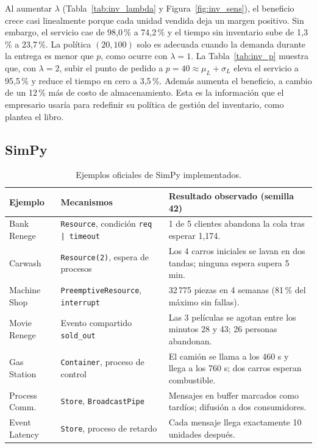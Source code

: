 \documentclass[11pt,a4paper]{article}
\begin{document}
Al aumentar $\lambda$ (Tabla~\ref{tab:inv_lambda} y Figura~\ref{fig:inv_sens}), el beneficio
crece casi linealmente porque cada unidad vendida deja un margen positivo. Sin embargo, el
servicio cae de 98,0\,\% a 74,2\,\% y el tiempo sin inventario sube de 1,3\,\% a 23,7\,\%.
La política $(20,100)$ solo es adecuada cuando la demanda durante la entrega es menor que
$p$, como ocurre con $\lambda=1$. La Tabla~\ref{tab:inv_p} muestra que, con $\lambda=2$,
subir el punto de pedido a $p=40\approx\mu_L+\sigma_L$ eleva el servicio a 95,5\,\% y reduce
el tiempo en cero a 3,5\,\%. Además aumenta el beneficio, a cambio de un 12\,\% más de costo
de almacenamiento. Esta es la información que el empresario usaría para redefinir su
política de gestión del inventario, como plantea el libro.

\subsection{SimPy}
\begin{table}[H]\centering\small
\caption{Ejemplos oficiales de SimPy implementados.}\label{tab:simpy}
\begin{tabular}{p{}p{}p{}}\toprule
\textbf{Ejemplo}&\textbf{Mecanismos}&\textbf{Resultado observado (semilla 42)}\\\midrule
Bank Renege&\texttt{Resource}, condición \texttt{req | timeout}&1 de 5 clientes abandona
la cola tras esperar 1,174.\\
Carwash&\texttt{Resource(2)}, espera de procesos&Los 4 carros iniciales se lavan en dos
tandas; ninguna espera supera 5 min.\\
Machine Shop&\texttt{PreemptiveResource}, \texttt{interrupt}&32\,775 piezas en 4 semanas
(81\,\% del máximo sin fallas).\\
Movie Renege&Evento compartido \texttt{sold\_out}&Las 3 películas se agotan entre los
minutos 28 y 43; 26 personas abandonan.\\
Gas Station&\texttt{Container}, proceso de control&El camión se llama a los 460 s y llega a
los 760 s; dos carros esperan combustible.\\
Process Comm.&\texttt{Store}, \texttt{BroadcastPipe}&Mensajes en buffer marcados como
tardíos; difusión a dos consumidores.\\
Event Latency&\texttt{Store}, proceso de retardo&Cada mensaje llega exactamente 10 unidades
después.\\\bottomrule
\end{tabular}\end{table}
\end{document}
